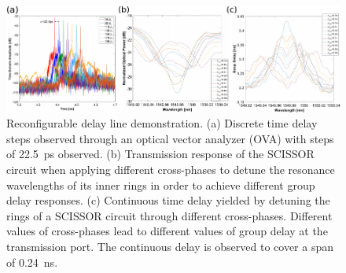 \begin{figure}[h]
	\begin{center}
		\includegraphics{figures/ch3-delay_luna.pdf}
	\end{center}
	\caption{Reconfigurable delay line demonstration.
		(a) Discrete time delay steps observed through an optical vector analyzer (OVA) with steps of 22.5~ps observed.
		(b) Transmission response of the SCISSOR circuit when applying different cross-phases to detune the resonance wavelengths of its inner rings in order to achieve different group delay responses.
		(c) Continuous time delay yielded by detuning the rings of a SCISSOR circuit through different cross-phases.
		Different values of cross-phases lead to different values of group delay at the transmission port.
		The continuous delay is observed to cover a span of 0.24~ns.
	}\label{fig:ch3-delay_luna}
\end{figure}

